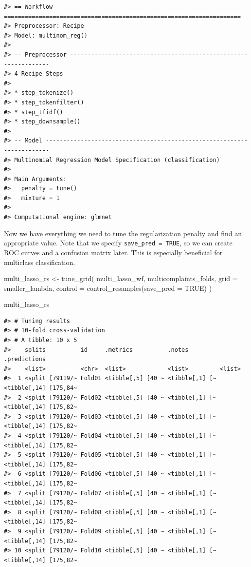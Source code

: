 \documentclass[
]{krantz}
\makeatletter
\newenvironment{Shaded}{\begin{snugshade}}{\end{snugshade}}
\newcommand{\AttributeTok}[1]{\textcolor[rgb]{0.77,0.63,0.00}{#1}}
\newcommand{\ConstantTok}[1]{\textcolor[rgb]{0.00,0.00,0.00}{#1}}
\newcommand{\FunctionTok}[1]{\textcolor[rgb]{0.00,0.00,0.00}{#1}}
\newcommand{\NormalTok}[1]{#1}
\newcommand{\OtherTok}[1]{\textcolor[rgb]{0.56,0.35,0.01}{#1}}
\newenvironment{kframe}{%
\medskip{}
\setlength{\fboxsep}{.8em}
 \def\at@end@of@kframe{}%
 \ifinner\ifhmode%
  \def\at@end@of@kframe{\end{minipage}}%
  \begin{minipage}{\columnwidth}%
 \fi\fi%
 \def\FrameCommand##1{\hskip\@totalleftmargin \hskip-\fboxsep
 \colorbox{shadecolor}{##1}\hskip-\fboxsep
     \hskip-\linewidth \hskip-\@totalleftmargin \hskip\columnwidth}%
 \MakeFramed {\advance\hsize-\width
   \@totalleftmargin\z@ \linewidth\hsize
   \@setminipage}}%
 {\par\unskip\endMakeFramed%
 \at@end@of@kframe}
\renewenvironment{Shaded}{\begin{kframe}}{\end{kframe}}
\makeatother
\begin{document}
\begin{verbatim}
#> == Workflow ====================================================================
#> Preprocessor: Recipe
#> Model: multinom_reg()
#> 
#> -- Preprocessor ----------------------------------------------------------------
#> 4 Recipe Steps
#> 
#> * step_tokenize()
#> * step_tokenfilter()
#> * step_tfidf()
#> * step_downsample()
#> 
#> -- Model -----------------------------------------------------------------------
#> Multinomial Regression Model Specification (classification)
#> 
#> Main Arguments:
#>   penalty = tune()
#>   mixture = 1
#> 
#> Computational engine: glmnet
\end{verbatim}

Now we have everything we need to tune the regularization penalty and find an appropriate value. Note that we specify \texttt{save\_pred\ =\ TRUE}, so we can create ROC curves and a confusion matrix later. This is especially beneficial for multiclass classification.

\begin{Shaded}
\begin{Highlighting}[]
\NormalTok{multi\_lasso\_rs }\OtherTok{\textless{}{-}} \FunctionTok{tune\_grid}\NormalTok{(}
\NormalTok{  multi\_lasso\_wf,}
\NormalTok{  multicomplaints\_folds,}
  \AttributeTok{grid =}\NormalTok{ smaller\_lambda,}
  \AttributeTok{control =} \FunctionTok{control\_resamples}\NormalTok{(}\AttributeTok{save\_pred =} \ConstantTok{TRUE}\NormalTok{)}
\NormalTok{)}

\NormalTok{multi\_lasso\_rs}
\end{Highlighting}
\end{Shaded}

\begin{verbatim}
#> # Tuning results
#> # 10-fold cross-validation 
#> # A tibble: 10 x 5
#>    splits          id     .metrics          .notes         .predictions         
#>    <list>          <chr>  <list>            <list>         <list>               
#>  1 <split [79119/~ Fold01 <tibble[,5] [40 ~ <tibble[,1] [~ <tibble[,14] [175,84~
#>  2 <split [79120/~ Fold02 <tibble[,5] [40 ~ <tibble[,1] [~ <tibble[,14] [175,82~
#>  3 <split [79120/~ Fold03 <tibble[,5] [40 ~ <tibble[,1] [~ <tibble[,14] [175,82~
#>  4 <split [79120/~ Fold04 <tibble[,5] [40 ~ <tibble[,1] [~ <tibble[,14] [175,82~
#>  5 <split [79120/~ Fold05 <tibble[,5] [40 ~ <tibble[,1] [~ <tibble[,14] [175,82~
#>  6 <split [79120/~ Fold06 <tibble[,5] [40 ~ <tibble[,1] [~ <tibble[,14] [175,82~
#>  7 <split [79120/~ Fold07 <tibble[,5] [40 ~ <tibble[,1] [~ <tibble[,14] [175,82~
#>  8 <split [79120/~ Fold08 <tibble[,5] [40 ~ <tibble[,1] [~ <tibble[,14] [175,82~
#>  9 <split [79120/~ Fold09 <tibble[,5] [40 ~ <tibble[,1] [~ <tibble[,14] [175,82~
#> 10 <split [79120/~ Fold10 <tibble[,5] [40 ~ <tibble[,1] [~ <tibble[,14] [175,82~
\end{verbatim}
\end{document}
